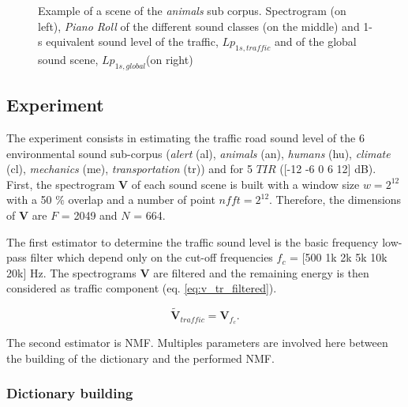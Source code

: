 \documentclass[twocolumn,a4paper,10pt]{article}
\begin{document}
\begin{figure}
\begin{minipage}[c]{.32\linewidth}
   \end{minipage}
\caption{Example of a scene of the \textit{animals} sub corpus. Spectrogram (on left), \textit{Piano Roll} of the different sound classes (on the middle) and 1-s equivalent sound level of the traffic, $Lp_{1s,traffic}$ and of the global sound scene, $Lp_{1s,global}$(on right)}
\label{fig:exampleScene}
\end{figure}

\subsection{Experiment}

The experiment consists in estimating the traffic road sound level of the 6 environmental sound sub-corpus (\textit{alert} (al), \textit{animals} (an), \textit{humans} (hu), \textit{climate} (cl), \textit{mechanics} (me), \textit{transportation} (tr)) and for 5 $TIR$ ([-12 -6 0 6 12] dB). First, the spectrogram $\mathbf{V}$ of each sound scene is built with a window size $w = 2^{12}$ with a 50 $\%$ overlap and a number of point $nfft = 2^{12}$. Therefore, the dimensions of $\mathbf{V}$ are $F$ = 2049 and $N$ = 664. 

The first estimator to determine the traffic sound level is the basic frequency low-pass filter which depend only on the cut-off frequencies $f_c$ = [500 1k 2k 5k 10k 20k] Hz. The spectrograms $\mathbf{V}$ are filtered and the remaining energy is then considered as traffic component (eq. \ref{eq:v_tr_filtered}). 

\begin{equation}\label{eq:v_tr_filtered}
\mathbf{\tilde{V}}_{traffic} = \mathbf{V}_{f_c}.
\end{equation}

The second estimator is NMF. Multiples parameters are involved here between the building of the dictionary and the performed NMF. 

\subsubsection{Dictionary building}\label{part:dictionary_learning}
\end{document}
